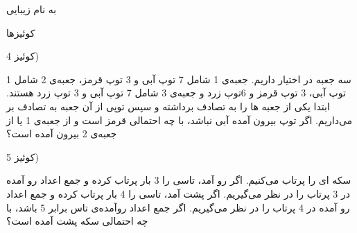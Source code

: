 \documentclass{article}
\begin{document}
\LARGE
\begin{center}

به نام زیبایی


کوئیزها

\end{center}
\hrulefill
\large


کوئیز 4)

سه جعبه در اختیار داریم. جعبه‌ی 1 شامل 7 توپ آبی و 3 توپ قرمز، جعبه‌ی 2 شامل 1 توپ آبی، 3 توپ قرمز و 6توپ زرد و جعبه‌ی 3 شامل 7 توپ آبی و 3 توپ زرد هستند. ابتدا یکی از جعبه ها را به تصادف برداشته و سپس توپی از آن جعبه به تصادف بر می‌داریم. اگر توپ بیرون آمده آبی نباشد، با چه احتمالی قرمز است و از جعبه‌ی 1 یا از جعبه‌ی 2 بیرون آمده است؟

کوئیز 5)

سکه ای را پرتاب می‌کنیم. اگر رو آمد، تاسی را 3 بار پرتاب کرده و جمع اعداد رو آمده در 3 پرتاب را در نظر می‌گیریم. اگر پشت آمد، تاسی را 4 بار پرتاب کرده و جمع اعداد رو آمده در 4 پرتاب را در نظر می‌گیریم. اگر جمع اعداد روآمده‌ی تاس برابر 5 باشد، با چه احتمالی سکه پشت آمده است؟
\end{document}

